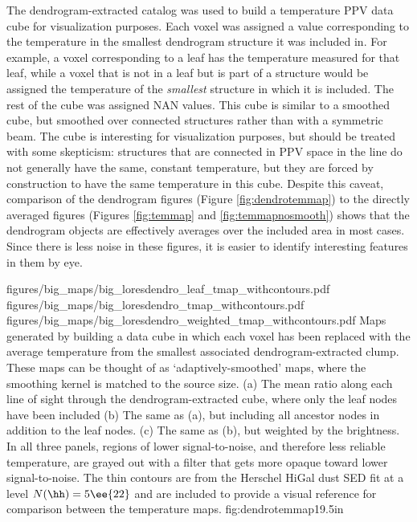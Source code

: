 The dendrogram-extracted catalog was used to build a temperature PPV data cube
for visualization purposes.  Each voxel was assigned a value corresponding to
the temperature in the smallest dendrogram structure it was included in.  For
example, a voxel corresponding to a leaf has the temperature measured for that
leaf, while a voxel that is not in a leaf but is part of a structure would be
assigned the temperature of the \emph{smallest} structure in which it is
included.  The rest of the
cube was assigned NAN values.  This cube is similar to a smoothed cube, but
smoothed over connected structures rather than with a symmetric beam.  The cube
is interesting for visualization purposes, but should be treated with some
skepticism: structures that are connected in PPV space in the \threeohthree
line do not generally have the same, constant temperature, but they are forced
by construction to have the same temperature in this cube.  Despite this
caveat, comparison of the dendrogram figures (Figure \ref{fig:dendrotemmap}) to
the directly averaged figures (Figures \ref{fig:temmap} and
\ref{fig:temmapnosmooth}) shows that the dendrogram objects are effectively
averages over the included area in most cases.  Since there is less noise in
these figures, it is easier to identify interesting features in them by eye.




\RotFigureThreeAA
{figures/big_maps/big_loresdendro_leaf_tmap_withcontours.pdf}
{figures/big_maps/big_loresdendro_tmap_withcontours.pdf}
{figures/big_maps/big_loresdendro_weighted_tmap_withcontours.pdf}
{Maps generated by building a data cube in which each voxel has been replaced
with the average temperature from the smallest associated dendrogram-extracted
clump.  These maps can be thought of as `adaptively-smoothed' maps, where the
smoothing kernel is matched to the source size.
(a) The mean ratio along each line of sight through the dendrogram-extracted
cube, where only the leaf nodes have been included
\newline
(b) The same as (a), but including all ancestor nodes in addition to the leaf
nodes. 
\newline
(c) The same as (b), but weighted by the \threeohthree brightness.
\newline
In all three panels, regions of lower signal-to-noise, and therefore less
reliable
temperature, are grayed out with a filter that gets more opaque toward lower
signal-to-noise.  The thin contours are from the Herschel HiGal
dust SED fit at a level $N(\hh)=5\ee{22}$ \percc and are included to provide a
visual reference for comparison between the temperature maps.
}
{fig:dendrotemmap}{1}{9.5in}

